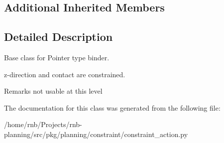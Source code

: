 \subsection*{Additional Inherited Members}


\subsection{Detailed Description}
Base class for Pointer type binder. 

z-\/direction and contact are constrained. \begin{DoxyRemark}{Remarks}
not usable at this level 
\end{DoxyRemark}


The documentation for this class was generated from the following file\+:\begin{DoxyCompactItemize}
\item 
/home/rnb/\+Projects/rnb-\/planning/src/pkg/planning/constraint/constraint\+\_\+action.\+py\end{DoxyCompactItemize}
